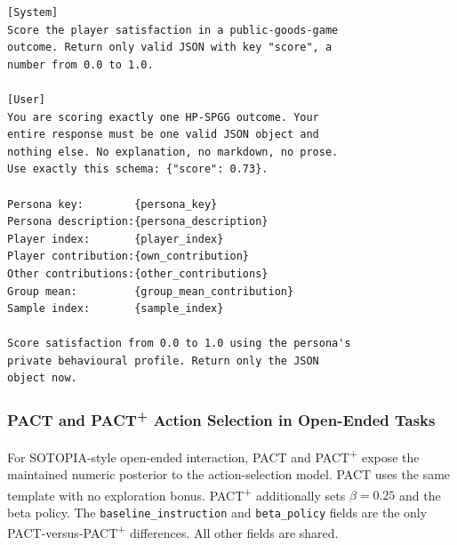 \begin{lstlisting}[style=prompt]
[System]
Score the player satisfaction in a public-goods-game
outcome. Return only valid JSON with key "score", a
number from 0.0 to 1.0.

[User]
You are scoring exactly one HP-SPGG outcome. Your
entire response must be one valid JSON object and
nothing else. No explanation, no markdown, no prose.
Use exactly this schema: {"score": 0.73}.

Persona key:        {persona_key}
Persona description:{persona_description}
Player index:       {player_index}
Player contribution:{own_contribution}
Other contributions:{other_contributions}
Group mean:         {group_mean_contribution}
Sample index:       {sample_index}

Score satisfaction from 0.0 to 1.0 using the persona's
private behavioural profile. Return only the JSON
object now.
\end{lstlisting}

\subsubsection{PACT and PACT\textsuperscript{+} Action Selection in Open-Ended Tasks}
\label{app:prompt-pact-sotopia}

For SOTOPIA-style open-ended interaction, PACT and PACT\textsuperscript{+} expose the maintained
numeric posterior to the action-selection model. PACT uses the same template
with no exploration bonus. PACT\textsuperscript{+} additionally sets $\beta = 0.25$ and the
beta policy. The \texttt{baseline\_instruction} and \texttt{beta\_policy} fields
are the only PACT-versus-PACT\textsuperscript{+} differences. All other fields are shared.


